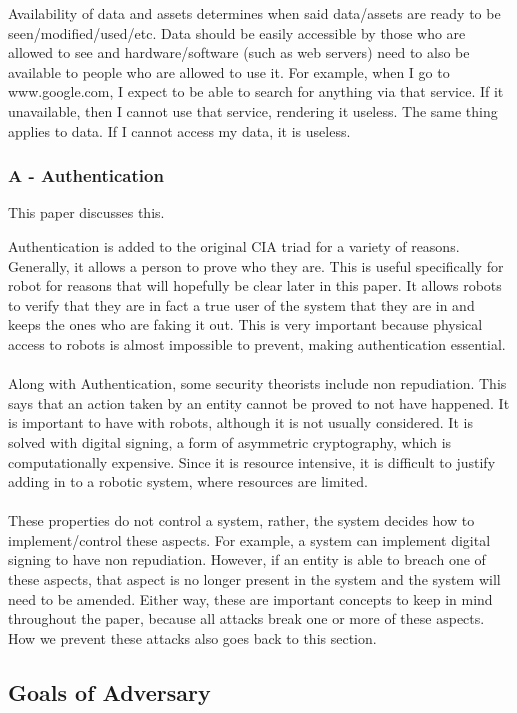 Availability of data and assets determines when said data/assets are ready to be seen/modified/used/etc. Data should be easily accessible by those who are allowed to see and hardware/software (such as web servers) need to also be available to people who are allowed to use it. For example, when I go to www.google.com, I expect to be able to search for anything via that service. If it unavailable, then I cannot use that service, rendering it useless. The same thing applies to data. If I cannot access my data, it is useless.

\subsubsection{A - Authentication}

This \cite{article:Martin} paper discusses this.

Authentication is added to the original CIA triad for a variety of reasons. Generally, it allows a person to prove who they are. This is useful specifically for robot for reasons that will hopefully be clear later in this paper. It allows robots to verify that they are in fact a true user of the system that they are in and keeps the ones who are faking it out. This is very important because physical access to robots is almost impossible to prevent, making authentication essential.
\\\\
Along with Authentication, some security theorists include non repudiation. This says that an action taken by an entity cannot be proved to not have happened. It is important to have with robots, although it is not usually considered. It is solved with digital signing, a form of asymmetric cryptography, which is computationally expensive. Since it is resource intensive, it is difficult to justify adding in to a robotic system, where resources are limited.
\\\\
These properties do not control a system, rather, the system decides how to implement/control these aspects. For example, a system can implement digital signing to have non repudiation. However, if an entity is able to breach one of these aspects, that aspect is no longer present in the system and the system will need to be amended. Either way, these are important concepts to keep in mind throughout the paper, because all attacks break one or more of these aspects. How we prevent these attacks also goes back to this section.

\subsection{Goals of Adversary}

